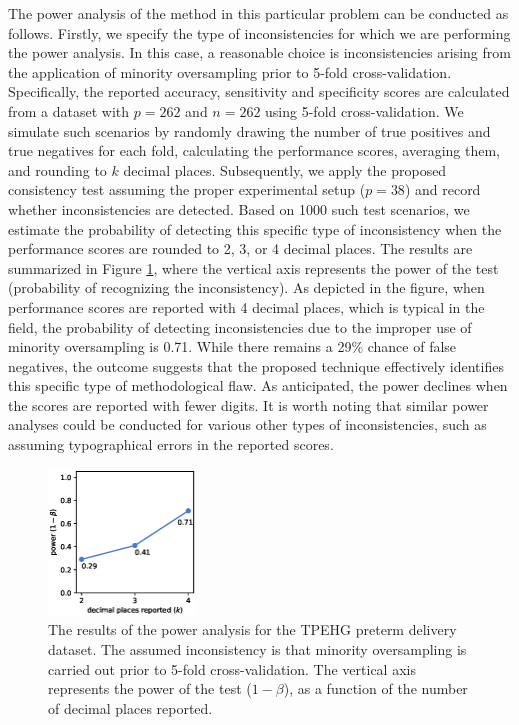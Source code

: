 \documentclass[3p, times]{elsarticle}
\begin{document}
The power analysis of the method in this particular problem can be conducted as follows. Firstly, we specify the type of inconsistencies for which we are performing the power analysis. In this case, a reasonable choice is inconsistencies arising from the application of minority oversampling prior to 5-fold cross-validation. Specifically, the reported accuracy, sensitivity and specificity scores are calculated from a dataset with $p=262$ and $n=262$ using 5-fold cross-validation.
We simulate such scenarios by randomly drawing the number of true positives and true negatives for each fold, calculating the performance scores, averaging them, and rounding to $k$ decimal places. Subsequently, we apply the proposed consistency test assuming the proper experimental setup ($p=38$) and record whether inconsistencies are detected. 
Based on 1000 such test scenarios, we estimate the probability of detecting this specific type of inconsistency when the performance scores are rounded to 2, 3, or 4 decimal places. The results are summarized in Figure \ref{fig:powertpehg}, where the vertical axis represents the power of the test (probability of recognizing the inconsistency). As depicted in the figure, when performance scores are reported with 4 decimal places, which is typical in the field, the probability of detecting inconsistencies due to the improper use of minority oversampling is 0.71. While there remains a 29\% chance of false negatives, the outcome suggests that the proposed technique effectively identifies this specific type of methodological flaw. As anticipated, the power declines when the scores are reported with fewer digits. It is worth noting that similar power analyses could be conducted for various other types of inconsistencies, such as assuming typographical errors in the reported scores.


\begin{figure}
    \begin{center}
        \includegraphics[width=0.35\textwidth]{power-tpehg.eps}
    \end{center}
    \caption{{The results of the power analysis for the TPEHG preterm delivery dataset. The assumed inconsistency is that minority oversampling is carried out prior to 5-fold cross-validation. The vertical axis represents the power of the test ($1 - \beta$), as a function of the number of decimal places reported.
    }}
    \label{fig:powertpehg}
\end{figure}
\end{document}
